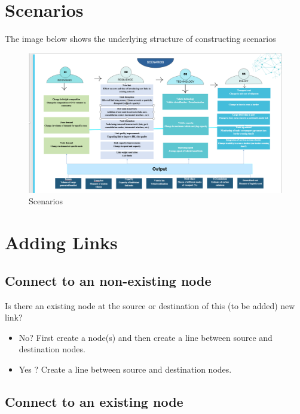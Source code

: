 \documentclass[
]{book}
\providecommand{\tightlist}{%
  \setlength{\itemsep}{0pt}\setlength{\parskip}{0pt}}
\begin{document}
\chapter{Scenarios}\label{scenarios}

The image below shows the underlying structure of constructing scenarios

\begin{figure}
\centering
\includegraphics{images/Picture1.png}
\caption{Scenarios}
\end{figure}

\chapter{Adding Links}\label{adding-links}

\section{Connect to an non-existing node}\label{connect-to-an-non-existing-node}

Is there an existing node at the source or destination of this (to be added) new link?

\begin{itemize}
\tightlist
\item
  No? First create a node(s) and then create a line between source and destination nodes.
\item
  Yes ? Create a line between source and destination nodes.
\end{itemize}

\section{Connect to an existing node}\label{connect-to-an-existing-node}
\end{document}
